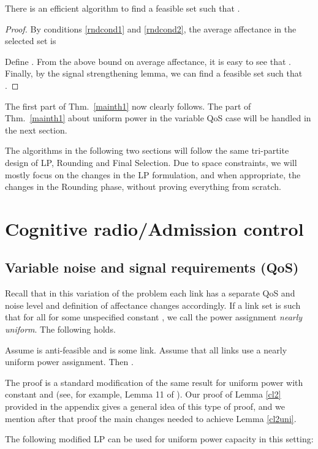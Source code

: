 \documentclass[11pt]{amsart}
\begin{document}
\begin{lemma}
There is an efficient algorithm to find a feasible set  such that .
\end{lemma}
\begin{proof}
By conditions \ref{rndcond1} and \ref{rndcond2},  the average
affectance in the selected set  is

Define . From the above bound on average affectance, it is easy to see that .
Finally, by the signal strengthening lemma, we can find a feasible set  such that
.
 \end{proof}
The first part of Thm.~\ref{mainth1} now clearly follows. The part of Thm.~\ref{mainth1} about uniform power in the variable QoS case will be handled in the next section.

The algorithms in the following two sections will follow the same tri-partite design of LP, Rounding and Final Selection. Due to space
constraints, we will mostly focus on the changes in the LP formulation, and when appropriate, the changes in the Rounding phase, without
proving everything from scratch.


\section{Cognitive radio/Admission control}

\subsection*{Variable noise and signal requirements (QoS)}

Recall that in this variation of the problem each link  has a separate QoS  and noise level  and definition of affectance
changes accordingly.
If a link set is such that  for all  for some unspecified constant , we call the 
power assignment \emph{nearly uniform}. The following holds.
\begin{lemma}
Assume  is anti-feasible and  is some link. Assume that all
links use a nearly uniform power assignment. Then  .
\label{cl2uni}
\end{lemma}
The proof is a standard modification of the same result for uniform
power with constant  and  (see, for example, Lemma 11 of
\cite{infocom11}).  Our proof of Lemma \ref{cl2} provided in the appendix gives a general idea
of this type of proof, and we mention after that proof the main changes needed to achieve Lemma \ref{cl2uni}.

The following modified LP can be used for uniform power capacity in this setting:
\end{document}
